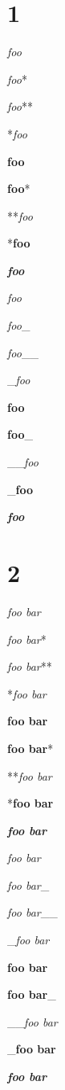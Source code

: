 
\def\mytitle{Emphasis Test}


\part{1}
\label{1}

\emph{foo}

\emph{foo}*

\emph{foo}**

*\emph{foo}

\textbf{foo}

\textbf{foo}*

**\emph{foo}

*\textbf{foo}

\textbf{\emph{foo}}

\emph{foo}

\emph{foo}\_

\emph{foo}\_\_

\_\emph{foo}

\textbf{foo}

\textbf{foo}\_

\_\_\emph{foo}

\_\textbf{foo}

\textbf{\emph{foo}}

\part{2}
\label{2}

\emph{foo bar}

\emph{foo bar}*

\emph{foo bar}**

*\emph{foo bar}

\textbf{foo bar}

\textbf{foo bar}*

**\emph{foo bar}

*\textbf{foo bar}

\textbf{\emph{foo bar}}

\emph{foo bar}

\emph{foo bar}\_

\emph{foo bar}\_\_

\_\emph{foo bar}

\textbf{foo bar}

\textbf{foo bar}\_

\_\_\emph{foo bar}

\_\textbf{foo bar}

\textbf{\emph{foo bar}}

